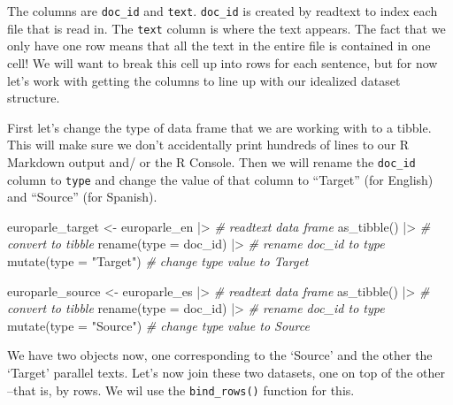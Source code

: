\documentclass[
  letterpaper,
]{scrbook}
\newenvironment{Shaded}{\begin{snugshade}}{\end{snugshade}}
\newcommand{\AttributeTok}[1]{\textcolor[rgb]{0.00,0.00,0.00}{#1}}
\newcommand{\CommentTok}[1]{\textcolor[rgb]{0.00,0.00,0.00}{\textit{#1}}}
\newcommand{\FunctionTok}[1]{\textcolor[rgb]{0.00,0.00,0.00}{#1}}
\newcommand{\NormalTok}[1]{\textcolor[rgb]{0.00,0.00,0.00}{#1}}
\newcommand{\OtherTok}[1]{\textcolor[rgb]{0.00,0.00,0.00}{#1}}
\newcommand{\SpecialCharTok}[1]{\textcolor[rgb]{0.00,0.00,0.00}{#1}}
\newcommand{\StringTok}[1]{\textcolor[rgb]{0.00,0.00,0.00}{#1}}
\begin{document}
The columns are \texttt{doc\_id} and \texttt{text}. \texttt{doc\_id} is
created by readtext to index each file that is read in. The
\texttt{text} column is where the text appears. The fact that we only
have one row means that all the text in the entire file is contained in
one cell! We will want to break this cell up into rows for each
sentence, but for now let's work with getting the columns to line up
with our idealized dataset structure.

First let's change the type of data frame that we are working with to a
tibble. This will make sure we don't accidentally print hundreds of
lines to our R Markdown output and/ or the R Console. Then we will
rename the \texttt{doc\_id} column to \texttt{type} and change the value
of that column to ``Target'' (for English) and ``Source'' (for Spanish).

\begin{Shaded}
\begin{Highlighting}[]
\NormalTok{europarle\_target }\OtherTok{\textless{}{-}} 
\NormalTok{  europarle\_en }\SpecialCharTok{|\textgreater{}} \CommentTok{\# readtext data frame}
  \FunctionTok{as\_tibble}\NormalTok{() }\SpecialCharTok{|\textgreater{}} \CommentTok{\# convert to tibble}
  \FunctionTok{rename}\NormalTok{(}\AttributeTok{type =}\NormalTok{ doc\_id) }\SpecialCharTok{|\textgreater{}} \CommentTok{\# rename doc\_id to type}
  \FunctionTok{mutate}\NormalTok{(}\AttributeTok{type =} \StringTok{"Target"}\NormalTok{) }\CommentTok{\# change type value to \textquotesingle{}Target\textquotesingle{}}

\NormalTok{europarle\_source }\OtherTok{\textless{}{-}} 
\NormalTok{  europarle\_es }\SpecialCharTok{|\textgreater{}} \CommentTok{\# readtext data frame}
  \FunctionTok{as\_tibble}\NormalTok{() }\SpecialCharTok{|\textgreater{}} \CommentTok{\# convert to tibble}
  \FunctionTok{rename}\NormalTok{(}\AttributeTok{type =}\NormalTok{ doc\_id) }\SpecialCharTok{|\textgreater{}} \CommentTok{\# rename doc\_id to type}
  \FunctionTok{mutate}\NormalTok{(}\AttributeTok{type =} \StringTok{"Source"}\NormalTok{) }\CommentTok{\# change type value to \textquotesingle{}Source\textquotesingle{}}
\end{Highlighting}
\end{Shaded}

We have two objects now, one corresponding to the `Source' and the other
the `Target' parallel texts. Let's now join these two datasets, one on
top of the other --that is, by rows. We wil use the
\texttt{bind\_rows()} function for this.
\end{document}
